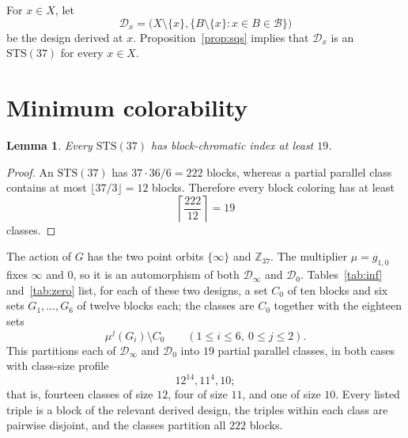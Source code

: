 \documentclass[11pt]{amsart}
\newtheorem{lemma}[theorem]{Lemma}
\newcommand{\Z}{\mathbb Z}
\newcommand{\STS}{\mathrm{STS}}
\begin{document}
For $x\in X$, let
\[
\mathcal D_x=
\bigl(X\setminus\{x\},
\{B\setminus\{x\}:x\in B\in\mathcal B\}\bigr)
\]
be the design derived at $x$. Proposition~\ref{prop:sqs} implies that
$\mathcal D_x$ is an $\STS(37)$ for every $x\in X$.

\section{Minimum colorability}

\begin{lemma}\label{lem:lower}
Every $\STS(37)$ has block-chromatic index at least $19$.
\end{lemma}

\begin{proof}
An $\STS(37)$ has $37\cdot36/6=222$ blocks, whereas a partial parallel
class contains at most $\lfloor37/3\rfloor=12$ blocks. Therefore every
block coloring has at least
\[
\left\lceil\frac{222}{12}\right\rceil=19
\]
classes.
\end{proof}

The action of $G$ has the two point orbits $\{\infty\}$ and
$\Z_{37}$. The multiplier $\mu=g_{1,0}$ fixes $\infty$ and $0$, so it
is an automorphism of both $\mathcal D_{\infty}$ and $\mathcal D_0$.
Tables~\ref{tab:inf} and~\ref{tab:zero} list, for each of these two
designs, a set $C_0$ of ten blocks and six sets $G_1,\dots,G_6$ of
twelve blocks each; the classes are $C_0$ together with the eighteen
sets
\[
\mu^{j}(G_i)\setminus C_0
\qquad(1\leq i\leq6,\ 0\leq j\leq2).
\]
This partitions each of $\mathcal D_{\infty}$ and $\mathcal D_0$ into
$19$ partial parallel classes, in both cases with class-size profile
\[
12^{14},11^4,10;
\]
that is, fourteen classes of size $12$, four of size $11$, and one of
size $10$. Every listed triple is a block of the relevant derived
design, the triples within each class are pairwise disjoint, and the
classes partition all $222$ blocks.
\end{document}
